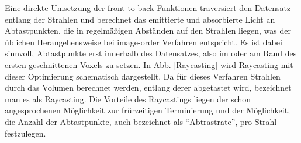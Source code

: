 \documentclass[a4paper,fontsize=12pt,toc=bib,halfparskip]{scrartcl}
\begin{document}
Eine direkte Umsetzung der front-to-back Funktionen traversiert den Datensatz entlang der Strahlen und berechnet das emittierte und absorbierte Licht an Abtastpunkten, die in regelm\"a{\ss}igen Abst\"anden auf den Strahlen liegen, was der \"ublichen Herangehensweise bei image-order Verfahren entspricht. Es ist dabei sinnvoll, Abtastpunkte erst innerhalb des Datensatzes, also im oder am Rand des ersten geschnittenen Voxels zu setzen. In Abb. \ref{Raycasting} wird Raycasting mit dieser Optimierung schematisch dargestellt. 
Da f\"ur dieses Verfahren Strahlen durch das Volumen berechnet werden, entlang derer abgetastet wird, bezeichnet man es als Raycasting. Die Vorteile des Raycastings liegen der schon angesprochenen M\"oglichkeit zur fr\"urzeitigen Terminierung und der M\"oglichkeit, die Anzahl der Abtastpunkte, auch bezeichnet als ``Abtrastrate'', pro Strahl festzulegen.
\end{document}
